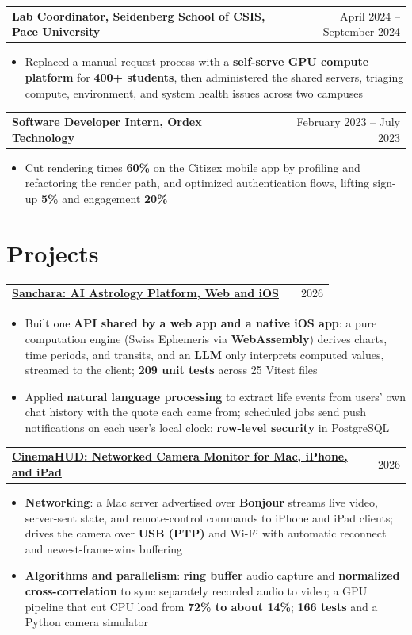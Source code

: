 \documentclass[a4paper,9.5pt]{article}
\makeatletter
\newenvironment{joblong}[2]
    {
    \begin{tabularx}{\linewidth}{@{}l X r@{}}
    \textbf{#1} & \hfill & #2 \\[0pt]
    \end{tabularx}
    \begin{minipage}[t]{\linewidth}
    \begin{itemize}[nosep,after=\strut, leftmargin=1em, itemsep=1pt,label=\textbullet]
    }
    {
    \end{itemize}
    \end{minipage}
    }
\makeatother
\begin{document}
\begin{joblong}{Lab Coordinator, Seidenberg School of CSIS, Pace University}{April 2024 -- September 2024}
\item Replaced a manual request process with a \textbf{self-serve GPU compute platform} for \textbf{400+ students}, then administered the shared servers, triaging compute, environment, and system health issues across two campuses
\end{joblong}

\begin{joblong}{Software Developer Intern, Ordex Technology}{February 2023 -- July 2023}
\item Cut rendering times \textbf{60\%} on the Citizex mobile app by profiling and refactoring the render path, and optimized authentication flows, lifting sign-up \textbf{5\%} and engagement \textbf{20\%}
\end{joblong}

\section{Projects}

\begin{joblong}{\href{https://github.com/shivvyas2/astra}{Sanchara: AI Astrology Platform, Web and iOS} \normalfont{(Next.js, TypeScript, PostgreSQL, Swift, Claude API)}}{2026}
\item Built one \textbf{API shared by a web app and a native iOS app}: a pure computation engine (Swiss Ephemeris via \textbf{WebAssembly}) derives charts, time periods, and transits, and an \textbf{LLM} only interprets computed values, streamed to the client; \textbf{209 unit tests} across 25 Vitest files
\item Applied \textbf{natural language processing} to extract life events from users' own chat history with the quote each came from; scheduled jobs send push notifications on each user's local clock; \textbf{row-level security} in PostgreSQL
\end{joblong}

\begin{joblong}{\href{https://github.com/shivvyas2/Sony-Alpha-A6400-Cinema-Monitor}{CinemaHUD: Networked Camera Monitor for Mac, iPhone, and iPad} \normalfont{(Swift, Python, Metal)}}{2026}
\item \textbf{Networking}: a Mac server advertised over \textbf{Bonjour} streams live video, server-sent state, and remote-control commands to iPhone and iPad clients; drives the camera over \textbf{USB (PTP)} and Wi-Fi with automatic reconnect and newest-frame-wins buffering
\item \textbf{Algorithms and parallelism}: \textbf{ring buffer} audio capture and \textbf{normalized cross-correlation} to sync separately recorded audio to video; a GPU pipeline that cut CPU load from \textbf{72\% to about 14\%}; \textbf{166 tests} and a Python camera simulator
\end{joblong}
\end{document}
